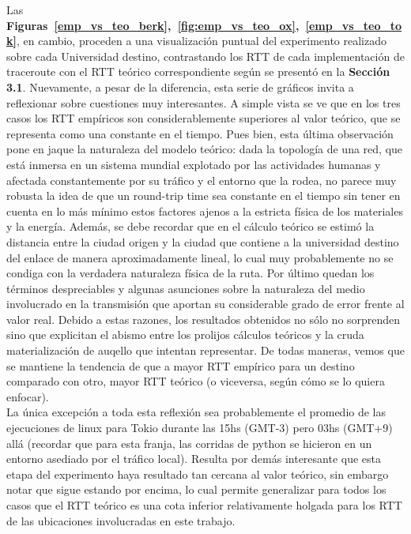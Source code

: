 \indent Las \textbf{Figuras~\ref{emp_vs_teo_berk},~\ref{fig:emp_vs_teo_ox},~\ref{emp_vs_teo_tok}}, en cambio, proceden a una visualización puntual del experimento realizado sobre cada Universidad destino, contrastando los RTT de cada implementación de traceroute con el RTT teórico correspondiente según se presentó en la \textbf{Sección 3.1}. Nuevamente, a pesar de la diferencia, esta serie de gráficos invita a reflexionar sobre cuestiones muy interesantes. A simple vista se ve que en los tres casos los RTT empíricos son considerablemente superiores al valor teórico, que se representa como una constante en el tiempo. Pues bien, esta última observación pone en jaque la naturaleza del modelo teórico: dada la topología de una red, que está inmersa en un sistema mundial explotado por las actividades humanas y afectada constantemente por su tráfico y el entorno que la rodea, no parece muy robusta la idea de que un round-trip time sea constante en el tiempo sin tener en cuenta en lo más mínimo estos factores ajenos a la estricta física de los materiales y la energía. Además, se debe recordar que en el cálculo teórico se estimó la distancia entre la ciudad origen y la ciudad que contiene a la universidad destino del enlace de manera aproximadamente lineal, lo cual muy probablemente no se condiga con la verdadera naturaleza física de la ruta. Por último quedan los términos despreciables y algunas asunciones sobre la naturaleza del medio involucrado en la transmisión que aportan su considerable grado de error frente al valor real. Debido a estas razones, los resultados obtenidos no sólo no sorprenden sino que explicitan el abismo entre los prolijos cálculos teóricos y la cruda materialización de auqello que intentan representar. De todas maneras, vemos que se mantiene la tendencia de que a mayor RTT empírico para un destino comparado con otro, mayor RTT teórico (o viceversa, según cómo se lo quiera enfocar).\\
\indent La única excepción a toda esta reflexión sea probablemente el promedio de las ejecuciones de linux para Tokio durante las 15hs (GMT-3) pero 03hs (GMT+9) allá (recordar que para esta franja, las corridas de python se hicieron en un entorno asediado por el tráfico local). Resulta por demás interesante que esta etapa del experimento haya resultado tan cercana al valor teórico, sin embargo notar que sigue estando por encima, lo cual permite generalizar para todos los casos que el RTT teórico es una cota inferior relativamente holgada para los RTT de las ubicaciones involucradas en este trabajo.\\
